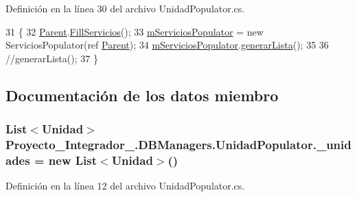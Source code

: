 Definición en la línea 30 del archivo Unidad\-Populator.\-cs.


\begin{DoxyCode}
31             \{
32                 \hyperlink{class_proyecto___integrador__3_1_1_d_b_managers_1_1_unidad_populator_af564e36862498316aa1c5483c7cd8bc1}{Parent}.\hyperlink{class_proyecto___integrador__3_1_1_d_b_managers_af60e768a1ec8417d606d3e718d6a22d5}{FillServicios}();
33                 \hyperlink{class_proyecto___integrador__3_1_1_d_b_managers_1_1_unidad_populator_a415439e84a77c50a90a5796f8f0e646d}{mServiciosPopulator} = \textcolor{keyword}{new} ServiciosPopulator(ref 
      \hyperlink{class_proyecto___integrador__3_1_1_d_b_managers_1_1_unidad_populator_af564e36862498316aa1c5483c7cd8bc1}{Parent});
34                 \hyperlink{class_proyecto___integrador__3_1_1_d_b_managers_1_1_unidad_populator_a415439e84a77c50a90a5796f8f0e646d}{mServiciosPopulator}.\hyperlink{class_proyecto___integrador__3_1_1_d_b_managers_1_1_servicios_populator_a9ac6be7f5ecdbdadd850b3519a985f75}{generarLista}();
35 
36                 \textcolor{comment}{//generarLista();}
37             \}
\end{DoxyCode}


\subsection{Documentación de los datos miembro}
\hypertarget{class_proyecto___integrador__3_1_1_d_b_managers_1_1_unidad_populator_a0704f72a36a446b2f4643226b9eb5917}{
\subsubsection[{\-\_\-unidades}]{\setlength{\rightskip}{0pt plus 5cm}List$<${\bf Unidad}$>$ Proyecto\-\_\-\-Integrador\-\_.\-D\-B\-Managers.\-Unidad\-Populator.\-\_\-unidades = new List$<${\bf Unidad}$>$()\hspace{0.3cm}{\ttfamily [private]}}}\label{class_proyecto___integrador__3_1_1_d_b_managers_1_1_unidad_populator_a0704f72a36a446b2f4643226b9eb5917}


Definición en la línea 12 del archivo Unidad\-Populator.\-cs.

